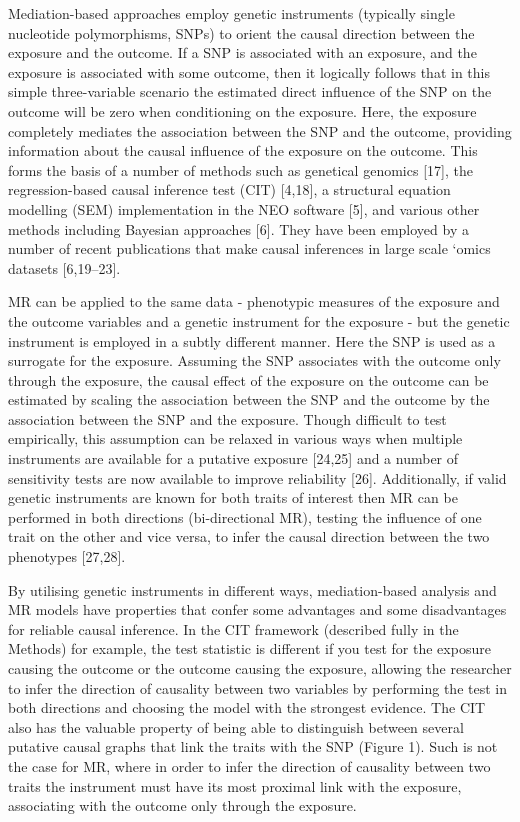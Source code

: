 \documentclass[]{article}
\begin{document}
Mediation-based approaches employ genetic instruments (typically single
nucleotide polymorphisms, SNPs) to orient the causal direction between
the exposure and the outcome. If a SNP is associated with an exposure,
and the exposure is associated with some outcome, then it logically
follows that in this simple three-variable scenario the estimated direct
influence of the SNP on the outcome will be zero when conditioning on
the exposure. Here, the exposure completely mediates the association
between the SNP and the outcome, providing information about the causal
influence of the exposure on the outcome. This forms the basis of a
number of methods such as genetical genomics {[}17{]}, the
regression-based causal inference test (CIT) {[}4,18{]}, a structural
equation modelling (SEM) implementation in the NEO software {[}5{]}, and
various other methods including Bayesian approaches {[}6{]}. They have
been employed by a number of recent publications that make causal
inferences in large scale `omics datasets {[}6,19--23{]}.

MR can be applied to the same data - phenotypic measures of the exposure
and the outcome variables and a genetic instrument for the exposure -
but the genetic instrument is employed in a subtly different manner.
Here the SNP is used as a surrogate for the exposure. Assuming the SNP
associates with the outcome only through the exposure, the causal effect
of the exposure on the outcome can be estimated by scaling the
association between the SNP and the outcome by the association between
the SNP and the exposure. Though difficult to test empirically, this
assumption can be relaxed in various ways when multiple instruments are
available for a putative exposure {[}24,25{]} and a number of
sensitivity tests are now available to improve reliability {[}26{]}.
Additionally, if valid genetic instruments are known for both traits of
interest then MR can be performed in both directions (bi-directional
MR), testing the influence of one trait on the other and vice versa, to
infer the causal direction between the two phenotypes {[}27,28{]}.

By utilising genetic instruments in different ways, mediation-based
analysis and MR models have properties that confer some advantages and
some disadvantages for reliable causal inference. In the CIT framework
(described fully in the Methods) for example, the test statistic is
different if you test for the exposure causing the outcome or the
outcome causing the exposure, allowing the researcher to infer the
direction of causality between two variables by performing the test in
both directions and choosing the model with the strongest evidence. The
CIT also has the valuable property of being able to distinguish between
several putative causal graphs that link the traits with the SNP (Figure
1). Such is not the case for MR, where in order to infer the direction
of causality between two traits the instrument must have its most
proximal link with the exposure, associating with the outcome only
through the exposure.
\end{document}
